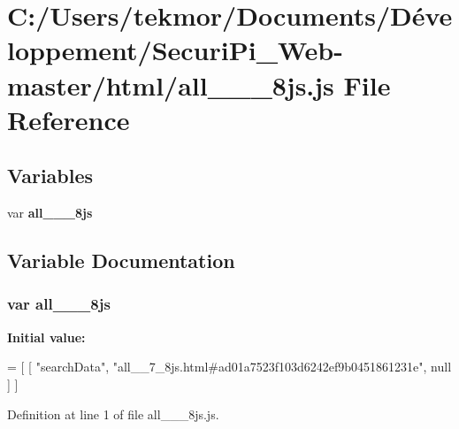 \section{C\+:/\+Users/tekmor/\+Documents/\+Développement/\+Securi\+Pi\+\_\+\+Web-\/master/html/all\+\_\+\+\_\+\_\+8js.js File Reference}
\label{all____7__8js_8js}
\subsection*{Variables}
\begin{DoxyCompactItemize}
\item 
var {\bf all\+\_\+\+\_\+\_\+8js}
\end{DoxyCompactItemize}


\subsection{Variable Documentation}
\subsubsection[{all\+\_\+\+\_\+7\+\_\+8js}]{\setlength{\rightskip}{0pt plus 5cm}var all\+\_\+\+\_\+\_\+8js}\label{all____7__8js_8js_a6b56be895f616a1b93f0503f2a28308d}
{\bfseries Initial value\+:}
\begin{DoxyCode}
=
[
    [ \textcolor{stringliteral}{"searchData"}, \textcolor{stringliteral}{"all\_\_7\_8js.html#ad01a7523f103d6242ef9b0451861231e"}, null ]
]
\end{DoxyCode}


Definition at line 1 of file all\+\_\+\+\_\+\_\+8js.\+js.

